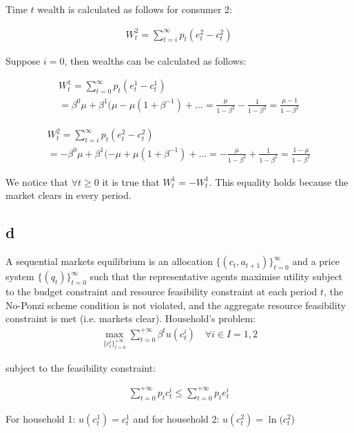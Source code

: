 \documentclass{article}
\begin{document}
Time $t$ wealth is calculated as follows for consumer 2:

\begin{gather*}
    W_t^2 = \sum^\infty_{t = i} p_t(e^2_t-c^2_t)
\end{gather*}

Suppose $i=0$, then wealths can be calculated as follows:

\begin{gather*}
    W_t^1 = \sum^\infty_{t = 0} p_t(e^1_t-c^1_t) \\
    = \beta^0\mu + \beta^1(\mu-\mu(1+\beta^{-1}) + \hdots
    = \frac{\mu}{1-\beta^2} - \frac{1}{1-\beta^2}
    = \frac{\mu - 1}{1-\beta^2}
\end{gather*}

\begin{gather*}
    W_t^2 = \sum^\infty_{t = i} p_t(e^2_t-c^2_t) \\
    = -\beta^0\mu + \beta^1(-\mu+\mu(1+\beta^{-1}) + \hdots
    = -\frac{\mu}{1-\beta^2} + \frac{1}{1-\beta^2}
    = \frac{1-\mu}{1-\beta^2}
\end{gather*}

We notice that $\forall t \geq 0$ it is true that $W_t^1 = -W^1_t$. This equality holds because the market clears in every period.

\subsection{d}

A sequential markets equilibrium is an allocation $\{(c_t, a_{t+1})\}^\infty_{t=0}$ and a price system $\{(q_t)\}^\infty_{t=0}$ such that the representative agents maximise utility subject to the budget constraint and resource feasibility constraint at each period $t$, the No-Ponzi scheme condition is not violated, and the aggregate resource feasibility constraint is met (i.e. markets clear).
Household's problem:
\begin{gather*}
    \max_{\{c_t^i\}^{+\infty}_{t=0}}\sum_{t=0}^{+\infty}\beta^tu(c_t^i)\quad\forall i\in I={1,2}
\end{gather*}

subject to the feasibility constraint:

\begin{gather*}
    \sum_{t=0}^{+\infty}p_tc_t^i\leq\sum_{t=0}^{+\infty}p_te_t^i
\end{gather*}

For household 1: $u(c_t^1)=c_t^1$ and for household 2: $u(c_t^2)=\ln(c_t^2$)\\
\end{document}
